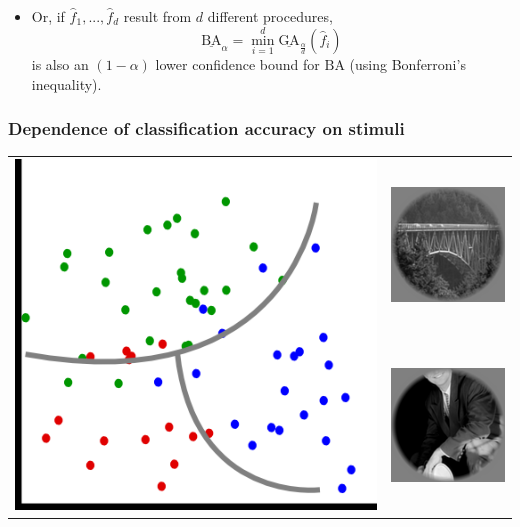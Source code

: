 \documentclass{beamer}
\begin{document}
\begin{frame}
\begin{center}
\begin{tabular}{ccc}
\end{tabular}
\end{center}
\begin{itemize}
\item Or, if $\hat{f}_1,...,\hat{f}_d$ result from $d$ different procedures,
\[
\underline{\text{BA}}_\alpha = \min_{i=1}^d \underline{\text{GA}}_{\frac{\alpha}{d}}(\hat{f}_i)
\]
is also an $(1-\alpha)$ lower confidence bound for $\text{BA}$ (using Bonferroni's inequality).
\end{itemize}
\end{frame}

\begin{frame}
\frametitle{Dependence of classification accuracy on stimuli}
\begin{multicols}{2}
\begin{tabular}{cc}
\multirow{4}{*}{\includegraphics[scale = 0.3]{model2.png}}
& \includegraphics[scale = 0.2]{img1.png} \\
& \includegraphics[scale = 0.2]{img2.png} \\

\end{tabular}
\end{multicols}
\end{frame}
\end{document}
